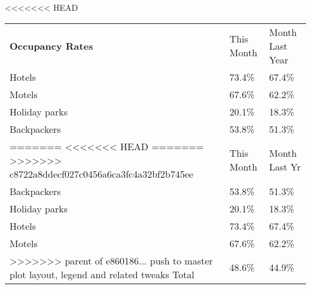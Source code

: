 <<<<<<< HEAD
\begin{tabular}[t]{p{4.5cm}>{\hfill}p{1.3cm}>{\hfill}p{1.7cm}}
 \textbf{Occupancy Rates} & This Month & Month Last Year \\ 
 Hotels & 73.4\% & 67.4\% \\ 
  Motels & 67.6\% & 62.2\% \\ 
  Holiday parks & 20.1\% & 18.3\% \\ 
  Backpackers & 53.8\% & 51.3\% \\ 
=======
<<<<<<< HEAD
=======
>>>>>>> c8722a8ddecf027c0456a6ca3fc4a32bf2b745ee
\begin{tabular}[t]{p{4.8cm}>{\hfill}p{1.3cm}>{\hfill}p{1.4cm}}
 \textbf{Occupancy Rates} & This Month & Month Last Yr \\ 
 Backpackers & 53.8\% & 51.3\% \\ 
  Holiday parks & 20.1\% & 18.3\% \\ 
  Hotels & 73.4\% & 67.4\% \\ 
  Motels & 67.6\% & 62.2\% \\ 
>>>>>>> parent of e860186... push to master plot layout, legend and related tweaks
  Total & 48.6\% & 44.9\% \\ 
  \end{tabular}
